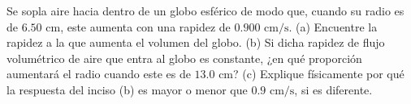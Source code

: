 \item Se sopla aire hacia dentro de un globo esférico de modo que, cuando su radio es de $6.50 \text{ cm}$, este aumenta con una rapidez de $0.900 \text{ cm/s}$. (a) Encuentre la rapidez a la que aumenta el volumen del globo. (b) Si dicha rapidez de flujo volumétrico de aire que entra al globo es constante, ¿en qué proporción aumentará el radio cuando este es de $13.0 \text{ cm}$? (c) Explique físicamente por qué la respuesta del inciso (b) es mayor o menor que $0.9 \text{ cm/s}$, si es diferente.
